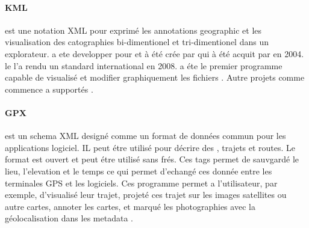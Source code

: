 \paragraph{KML}\cite{wiki:kml}
 est une notation XML pour exprimé les annotations geographic et les visualisation des catographies bi-dimentionel et tri-dimentionel dans un explorateur.  a ete developper pour  et à été crée par  qui à été acquit par  en 2004. le  l'a rendu un standard international en 2008.  a éte le premier programme capable de visualisé et modifier graphiquement les fichiers . Autre projets comme  commence a supportés .
\paragraph{GPX}\cite{wiki:gpx}
 est un schema XML designé comme un format de données  commun pour les applications logiciel.
IL peut étre utilisé pour décrire des , trajets et routes. Le format est ouvert et peut étre utilisé sans frés. Ces tags permet de sauvgardé le lieu, l'elevation et le temps ce qui permet d'echangé ces donnée entre les terminales GPS et les logiciels. Ces programme permet a l'utilisateur, par exemple, d'visualisé leur trajet, projeté ces trajet sur les images satellites ou autre cartes, annoter les cartes, et marqué les photographies avec la géolocalisation dans les metadata .